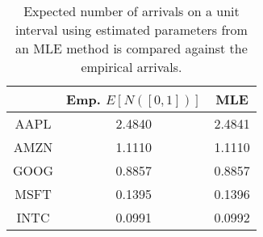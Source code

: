 \begin{table}[htpb]

\centering
\small

\begin{tabular}{ c | c | c }

 & Emp. $E[N([0,1])]$ & MLE\\
\hline
AAPL & 2.4840 & 2.4841\\

AMZN & 1.1110 & 1.1110\\

GOOG & 0.8857 & 0.8857\\

MSFT & 0.1395 & 0.1396\\

INTC & 0.0991 & 0.0992\\

\end{tabular}
\caption{\label{table:unitinterval} Expected number of arrivals on a unit interval using estimated parameters from an MLE method is compared against the empirical arrivals.}
\end{table}